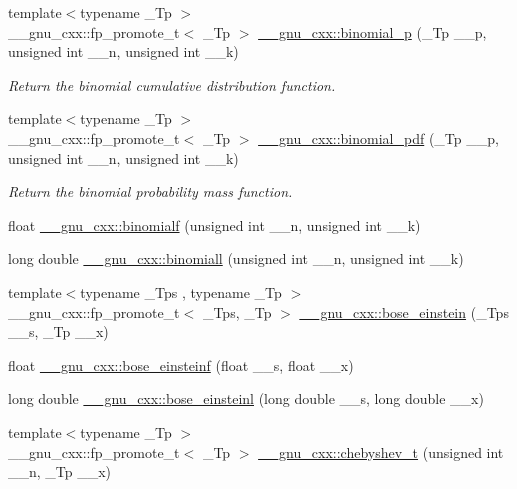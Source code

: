 \begin{DoxyCompactItemize}
{\footnotesize template$<$typename \+\_\+\+Tp $>$ }\\\+\_\+\+\_\+gnu\+\_\+cxx\+::fp\+\_\+promote\+\_\+t$<$ \+\_\+\+Tp $>$ \hyperlink{group__mathsf__gnu_ga54276b9f03ad7b10e991b1681e0d2dd3}{\+\_\+\+\_\+gnu\+\_\+cxx\+::binomial\+\_\+p} (\+\_\+\+Tp \+\_\+\+\_\+p, unsigned int \+\_\+\+\_\+n, unsigned int \+\_\+\+\_\+k)
\begin{DoxyCompactList}\small\item\em Return the binomial cumulative distribution function. \end{DoxyCompactList}\item 
{\footnotesize template$<$typename \+\_\+\+Tp $>$ }\\\+\_\+\+\_\+gnu\+\_\+cxx\+::fp\+\_\+promote\+\_\+t$<$ \+\_\+\+Tp $>$ \hyperlink{group__mathsf__gnu_gab726f5ed3181466baa0374e723ab5fb2}{\+\_\+\+\_\+gnu\+\_\+cxx\+::binomial\+\_\+pdf} (\+\_\+\+Tp \+\_\+\+\_\+p, unsigned int \+\_\+\+\_\+n, unsigned int \+\_\+\+\_\+k)
\begin{DoxyCompactList}\small\item\em Return the binomial probability mass function. \end{DoxyCompactList}\item 
float \hyperlink{group__mathsf__gnu_ga3882a077dacc6e627ca48abc05d7db48}{\+\_\+\+\_\+gnu\+\_\+cxx\+::binomialf} (unsigned int \+\_\+\+\_\+n, unsigned int \+\_\+\+\_\+k)
\item 
long double \hyperlink{group__mathsf__gnu_ga57602195f9215f735793c11d3210ac93}{\+\_\+\+\_\+gnu\+\_\+cxx\+::binomiall} (unsigned int \+\_\+\+\_\+n, unsigned int \+\_\+\+\_\+k)
\item 
{\footnotesize template$<$typename \+\_\+\+Tps , typename \+\_\+\+Tp $>$ }\\\+\_\+\+\_\+gnu\+\_\+cxx\+::fp\+\_\+promote\+\_\+t$<$ \+\_\+\+Tps, \+\_\+\+Tp $>$ \hyperlink{group__mathsf__gnu_gae8135b6861a48f2cee2e692093a17102}{\+\_\+\+\_\+gnu\+\_\+cxx\+::bose\+\_\+einstein} (\+\_\+\+Tps \+\_\+\+\_\+s, \+\_\+\+Tp \+\_\+\+\_\+x)
\item 
float \hyperlink{group__mathsf__gnu_gac1fb313fba5639d4168b6ee682507688}{\+\_\+\+\_\+gnu\+\_\+cxx\+::bose\+\_\+einsteinf} (float \+\_\+\+\_\+s, float \+\_\+\+\_\+x)
\item 
long double \hyperlink{group__mathsf__gnu_ga995c3ff580f81afb139f9cd50f445b48}{\+\_\+\+\_\+gnu\+\_\+cxx\+::bose\+\_\+einsteinl} (long double \+\_\+\+\_\+s, long double \+\_\+\+\_\+x)
\item 
{\footnotesize template$<$typename \+\_\+\+Tp $>$ }\\\+\_\+\+\_\+gnu\+\_\+cxx\+::fp\+\_\+promote\+\_\+t$<$ \+\_\+\+Tp $>$ \hyperlink{group__mathsf__gnu_ga4d9cae9de13a64ceeb4fb0226f4b7844}{\+\_\+\+\_\+gnu\+\_\+cxx\+::chebyshev\+\_\+t} (unsigned int \+\_\+\+\_\+n, \+\_\+\+Tp \+\_\+\+\_\+x)

\end{DoxyCompactItemize}
